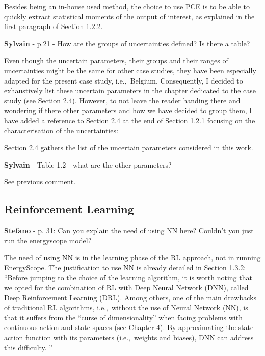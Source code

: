 \documentclass[12pt,a4paper]{article}
\def\ie{i.e.,\ }
\begin{document}
\noindent Besides being an in-house used method, the choice to use PCE is to be able to quickly extract statistical moments of the output of interest, as explained {\color{blue}in the first paragraph of Section 1.2.2}.

\begin{mdframed}[style=comment] %
{\color{purple} \textbf{Sylvain}} - p.21 - How are the groups of uncertainties defined? Is there a table?
\end{mdframed}

\noindent Even though the uncertain parameters, their groups and their ranges of uncertainties might be the same for other case studies, they have been especially adapted for the present case study, \ie Belgium. Consequently, I decided to exhaustively list these uncertain parameters in the chapter dedicated to the case study (see Section 2.4). However, to not leave the reader handing there and wondering if there other parameters and how we have decided to group them, I have added a reference to Section 2.4 {\color{blue}at the end of Section 1.2.1} focusing on the characterisation of the uncertainties:

\begin{mdframed}[style=manuscript] %
Section 2.4 gathers the list of the uncertain parameters considered in this work.
\end{mdframed}

\begin{mdframed}[style=comment] %
{\color{purple} \textbf{Sylvain}} - Table 1.2 - what are the other parameters?
\end{mdframed}

\noindent See previous comment.

\subsection{Reinforcement Learning}
\label{methodo_RL}

\begin{mdframed}[style=comment] %
{\color{orange} \textbf{Stefano}} - p. 31: Can you explain the need of using NN here? Couldn’t you just run the energyscope model?
\end{mdframed}

\noindent The need of using NN is in the learning phase of the RL approach, not in running EnergyScope. The justification to use NN is already detailed in Section 1.3.2: ``Before jumping to the choice of the learning algorithm, it is worth noting that we opted for the combination of RL with Deep Neural Network (DNN), called Deep Reinforcement Learning (DRL). Among others, one of the main drawbacks of traditional RL algorithms, \ie without the use of Neural Network (NN),  is that it suffers from the ``curse of dimensionality'' when facing problems with continuous action and state spaces (see Chapter 4). By approximating the state-action function with its parameters (\ie weights and biases), DNN can address this difficulty. ''
\end{document}
